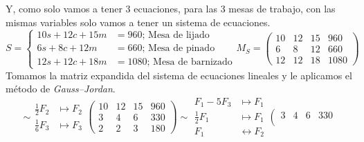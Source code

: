 \documentclass{article}
\begin{document}
\begin{enumerate}
\begin{itemize}
                Y, como solo vamos a tener 3 ecuaciones, para las 3 mesas de trabajo, con las mismas variables solo vamos a tener un sistema de ecuaciones.
                \[
                    S =
                    \left\{
                    \begin{aligned}
                        10s + 12c + 15m &= 960 \text{; Mesa de lijado} \\
                        6s + 8c + 12m &= 660 \text{; Mesa de pinado} \\
                        12s + 12c + 18m &= 1080 \text{; Mesa de barnizado}
                    \end{aligned}
                    \right.
                    M_S =
                    \left(
                    \begin{array}{ccc|c}
                        10 & 12 & 15 & 960 \\
                        6 & 8 & 12 & 660 \\
                        12 & 12 & 18 & 1080
                    \end{array}
                    \right)
                \]
                Tomamos la matriz expandida del sistema de ecuaciones lineales y le aplicamos el método de \emph{Gauss--Jordan}.
                \[
                    \sim
                    \begin{aligned}
                        \frac{1}{2}F_2 &\mapsto F_2 \\
                        \frac{1}{6}F_3 &\mapsto F_3
                    \end{aligned}
                    \left(
                    \begin{array}{ccc|c}
                        10 & 12 & 15 & 960 \\
                        3 & 4 & 6 & 330 \\
                        2 & 2 & 3 & 180
                    \end{array}
                    \right)
                    \sim
                    \begin{aligned}
                        F_1 - 5F_3 &\mapsto F_1 \\
                        \frac{1}{2}F_1 &\mapsto F_1 \\
                        F_1 &\leftrightarrow F_2
                    \end{aligned}
                    \left(
                    \begin{array}{ccc|c}
                        3 & 4 & 6 & 330 \\

\end{array}\]
\end{itemize}
\end{enumerate}
\end{document}
